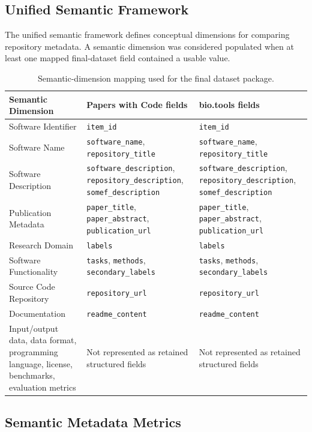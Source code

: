 \documentclass[pdflatex,sn-mathphys-num]{sn-jnl}
\theoremstyle{thmstyleone}%
\theoremstyle{thmstyletwo}%
\theoremstyle{thmstylethree}%
\begin{document}
\subsection{Unified Semantic Framework}
\label{subsec:semantic-framework}

The unified semantic framework defines conceptual dimensions for comparing repository metadata. A semantic dimension was considered populated when at least one mapped final-dataset field contained a usable value.

\begin{table}[htbp]
\centering
\small
\caption{Semantic-dimension mapping used for the final dataset package.}
\label{tab:semantic-crosswalk}
\begin{tabularx}{\textwidth}{p{3.4cm}YY}
\toprule
Semantic Dimension & Papers with Code fields & bio.tools fields \\
\midrule
Software Identifier & \texttt{item\_id} & \texttt{item\_id} \\
Software Name & \texttt{software\_name}, \texttt{repository\_title} & \texttt{software\_name}, \texttt{repository\_title} \\
Software Description & \texttt{software\_description}, \texttt{repository\_description}, \texttt{somef\_description} & \texttt{software\_description}, \texttt{repository\_description}, \texttt{somef\_description} \\
Publication Metadata & \texttt{paper\_title}, \texttt{paper\_abstract}, \texttt{publication\_url} & \texttt{paper\_title}, \texttt{paper\_abstract}, \texttt{publication\_url} \\
Research Domain & \texttt{labels} & \texttt{labels} \\
Software Functionality & \texttt{tasks}, \texttt{methods}, \texttt{secondary\_labels} & \texttt{tasks}, \texttt{methods}, \texttt{secondary\_labels} \\
Source Code Repository & \texttt{repository\_url} & \texttt{repository\_url} \\
Documentation & \texttt{readme\_content} & \texttt{readme\_content} \\
Input/output data, data format, programming language, license, benchmarks, evaluation metrics & Not represented as retained structured fields & Not represented as retained structured fields \\
\bottomrule
\end{tabularx}
\end{table}

\subsection{Semantic Metadata Metrics}
\label{subsec:semantic-metrics}
\end{document}
